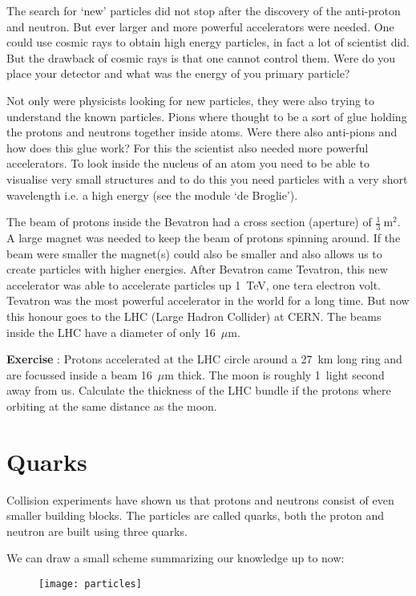 The search for `new' particles did not stop after the discovery of the anti-proton and neutron. But ever larger and more powerful accelerators were needed. One could use cosmic rays to obtain high energy particles, in fact a lot of scientist did. But the drawback of cosmic rays is that one cannot control them. Were do you place your detector and what was the energy of you primary particle?

Not only were physicists looking for new particles, they were also trying to understand the known particles. Pions where thought to be a sort of glue holding the protons and neutrons together inside atoms. Were there also anti-pions and how does this glue work? For this the scientist also needed more powerful accelerators. To look inside the nucleus of an atom you need to be able to visualise very small structures and to do this you need particles with a very short wavelength i.e. a high energy (see the module `de Broglie').

The beam of protons inside the Bevatron had a cross section (aperture) of $\frac{1}{3}~\mbox{m}^2$. A large magnet was needed to keep the beam of protons spinning around. If the beam were smaller the magnet(s) could also be smaller and also allows us to create particles with higher energies. After Bevatron came Tevatron, this new accelerator was able to accelerate particles up 1~TeV, one tera electron volt. Tevatron was the most powerful accelerator in the world for a long time. But now this honour goes to the LHC (Large Hadron Collider) at CERN. The beams inside the LHC have a diameter of only 16~$\mu$m.

\begin{shaded}
\textbf{Exercise \theExercise {}} : Protons accelerated at the LHC circle around a 27~km long ring and are focussed inside a beam 16~$\mu$m thick. The moon is roughly 1~light second away from us. Calculate the thickness of the LHC bundle if the protons where orbiting at the same distance as the moon.  \end{shaded}

\section{Quarks}
Collision experiments have shown us that protons and neutrons consist of even smaller building blocks. The particles are called quarks, both the proton and neutron are built using three quarks.

We can draw a small scheme summarizing our knowledge up to now:
\begin{figure}[h]\begin{center}
\texttt{[image: particles]}
\label{fig:particles}
\end{center}\end{figure}

